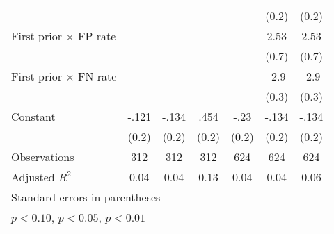 \begin{table}[htbp]
\begin{tabular}{l*{6}{c}}
                &                  &                  &                  &                  &    (0.2)         &    (0.2)         \\
First prior $\times$ FP rate&                  &                  &                  &                  &     2.53\sym{***}&     2.53\sym{***}\\
                &                  &                  &                  &                  &    (0.7)         &    (0.7)         \\
First prior $\times$ FN rate&                  &                  &                  &                  &     -2.9\sym{***}&     -2.9\sym{***}\\
                &                  &                  &                  &                  &    (0.3)         &    (0.3)         \\
Constant        &    -.121         &    -.134         &     .454\sym{*}  &     -.23         &    -.134         &    -.134         \\
                &    (0.2)         &    (0.2)         &    (0.2)         &    (0.2)         &    (0.2)         &    (0.2)         \\
\hline
Observations    &      312         &      312         &      312         &      624         &      624         &      624         \\
Adjusted \(R^{2}\)&     0.04         &     0.04         &     0.13         &     0.04         &     0.04         &     0.06         \\
\hline\hline
\multicolumn{7}{l}{\footnotesize Standard errors in parentheses}\\
\multicolumn{7}{l}{\footnotesize \sym{*} \(p<0.10\), \sym{**} \(p<0.05\), \sym{***} \(p<0.01\)}\\
\end{tabular}
\end{table}

